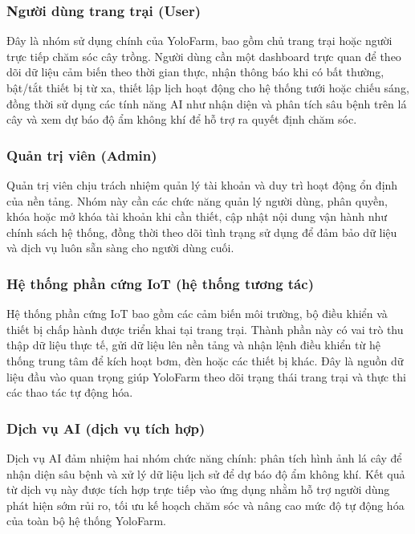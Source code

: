 \subsubsection{Người dùng trang trại (User)}
\indent Đây là nhóm sử dụng chính của YoloFarm, bao gồm chủ trang trại hoặc người trực tiếp chăm sóc cây trồng. Người dùng cần một dashboard trực quan để theo dõi dữ liệu cảm biến theo thời gian thực, nhận thông báo khi có bất thường, bật/tắt thiết bị từ xa, thiết lập lịch hoạt động cho hệ thống tưới hoặc chiếu sáng, đồng thời sử dụng các tính năng AI như nhận diện và phân tích sâu bệnh trên lá cây và xem dự báo độ ẩm không khí để hỗ trợ ra quyết định chăm sóc.

\subsubsection{Quản trị viên (Admin)}
\indent Quản trị viên chịu trách nhiệm quản lý tài khoản và duy trì hoạt động ổn định của nền tảng. Nhóm này cần các chức năng quản lý người dùng, phân quyền, khóa hoặc mở khóa tài khoản khi cần thiết, cập nhật nội dung vận hành như chính sách hệ thống, đồng thời theo dõi tình trạng sử dụng để đảm bảo dữ liệu và dịch vụ luôn sẵn sàng cho người dùng cuối.

\subsubsection{Hệ thống phần cứng IoT (hệ thống tương tác)}
\indent Hệ thống phần cứng IoT bao gồm các cảm biến môi trường, bộ điều khiển và thiết bị chấp hành được triển khai tại trang trại. Thành phần này có vai trò thu thập dữ liệu thực tế, gửi dữ liệu lên nền tảng và nhận lệnh điều khiển từ hệ thống trung tâm để kích hoạt bơm, đèn hoặc các thiết bị khác. Đây là nguồn dữ liệu đầu vào quan trọng giúp YoloFarm theo dõi trạng thái trang trại và thực thi các thao tác tự động hóa.

\subsubsection{Dịch vụ AI (dịch vụ tích hợp)}
\indent Dịch vụ AI đảm nhiệm hai nhóm chức năng chính: phân tích hình ảnh lá cây để nhận diện sâu bệnh và xử lý dữ liệu lịch sử để dự báo độ ẩm không khí. Kết quả từ dịch vụ này được tích hợp trực tiếp vào ứng dụng nhằm hỗ trợ người dùng phát hiện sớm rủi ro, tối ưu kế hoạch chăm sóc và nâng cao mức độ tự động hóa của toàn bộ hệ thống YoloFarm.